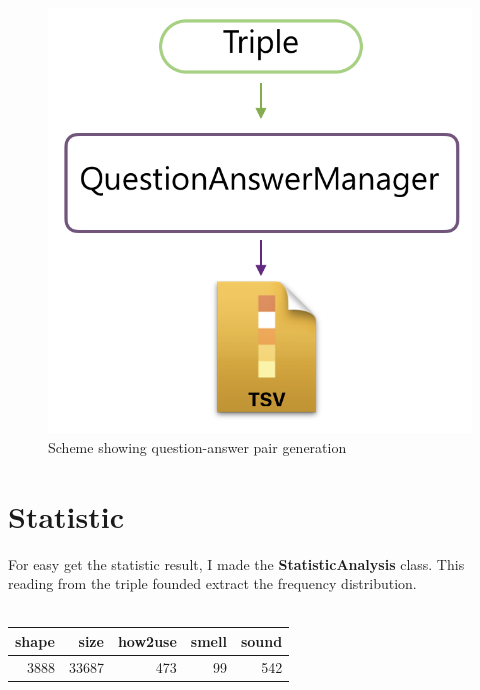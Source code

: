 \documentclass[conference,compsoc]{IEEEtran}
\begin{document}
\begin{figure}[h]
\centering
\includegraphics[scale=0.28]{qamanager}
\caption{ Scheme showing question-answer pair generation}
\end{figure}

\section{Statistic}
For easy get the statistic result, I made the \textbf{StatisticAnalysis} class. This reading from the triple founded extract the frequency distribution. \\
\\

\begin{tabular}{rrrrr}
\hline
   shape &   size &   how2use &   smell &   sound \\
\hline
    3888 &  33687 &       473 &      99 &     542 \\
\hline
\end{tabular}
\end{document}
